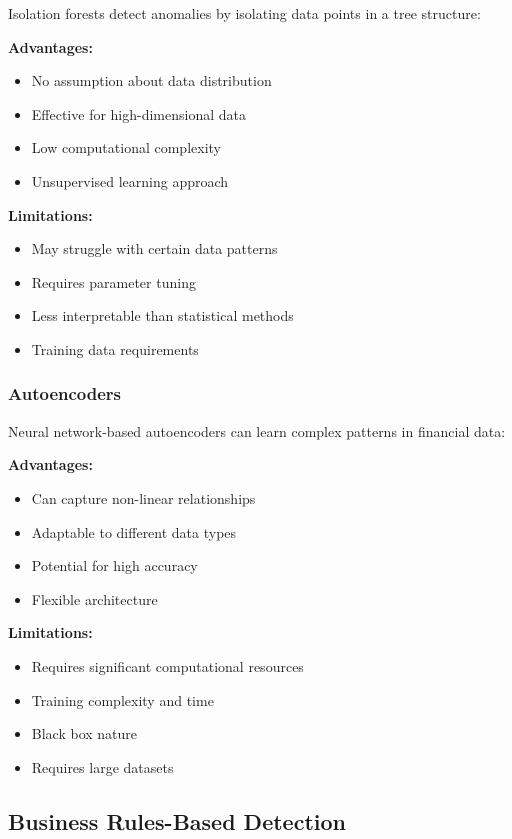 Isolation forests detect anomalies by isolating data points in a tree structure:

\textbf{Advantages:}
\begin{itemize}
    \item No assumption about data distribution
    \item Effective for high-dimensional data
    \item Low computational complexity
    \item Unsupervised learning approach
\end{itemize}

\textbf{Limitations:}
\begin{itemize}
    \item May struggle with certain data patterns
    \item Requires parameter tuning
    \item Less interpretable than statistical methods
    \item Training data requirements
\end{itemize}

\subsubsection{Autoencoders}

Neural network-based autoencoders can learn complex patterns in financial data:

\textbf{Advantages:}
\begin{itemize}
    \item Can capture non-linear relationships
    \item Adaptable to different data types
    \item Potential for high accuracy
    \item Flexible architecture
\end{itemize}

\textbf{Limitations:}
\begin{itemize}
    \item Requires significant computational resources
    \item Training complexity and time
    \item Black box nature
    \item Requires large datasets
\end{itemize}

\subsection{Business Rules-Based Detection}

